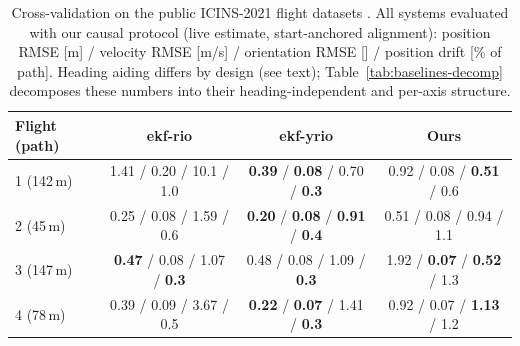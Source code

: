 \documentclass[journal]{IEEEtran}
\begin{document}
\begin{table}[t]
\caption{Cross-validation on the public ICINS-2021 flight datasets
\cite{doer2021yrio}.  All systems evaluated with our causal protocol
(live estimate, start-anchored alignment): position RMSE [m] /
velocity RMSE [m/s] / orientation RMSE [\degree] / position drift
[\% of path].  Heading aiding differs by design (see text);
Table~\ref{tab:baselines-decomp} decomposes these numbers into their
heading-independent and per-axis structure.}
\label{tab:baselines}
\centering
\footnotesize
\setlength{\tabcolsep}{3.5pt}
\begin{tabular}{lccc}
\toprule
Flight (path) & ekf-rio & ekf-yrio & Ours \\
\midrule
1 (142\,m) & 1.41 / 0.20 / 10.1 / 1.0 & \textbf{0.39} / \textbf{0.08} / 0.70 / \textbf{0.3} & 0.92 / 0.08 / \textbf{0.51} / 0.6 \\
2 (45\,m)  & 0.25 / 0.08 / 1.59 / 0.6 & \textbf{0.20} / \textbf{0.08} / \textbf{0.91} / \textbf{0.4} & 0.51 / 0.08 / 0.94 / 1.1 \\
3 (147\,m) & \textbf{0.47} / 0.08 / 1.07 / \textbf{0.3} & 0.48 / 0.08 / 1.09 / \textbf{0.3} & 1.92 / \textbf{0.07} / \textbf{0.52} / 1.3 \\
4 (78\,m)  & 0.39 / 0.09 / 3.67 / 0.5 & \textbf{0.22} / \textbf{0.07} / 1.41 / \textbf{0.3} & 0.92 / 0.07 / \textbf{1.13} / 1.2 \\
\bottomrule
\end{tabular}
\end{table}
\end{document}
